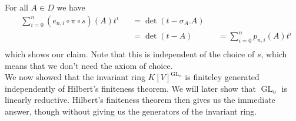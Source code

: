 \begin{dexample}
  For all $A\in D$ we have
  \begin{equation}
    \begin{aligned}
      &\sum_{i=0}^n (e_{n,i} \circ \pi \circ s)(A)t^i&&=\operatorname{det}(t-\sigma_A.A)\\
      &&&=\operatorname{det}(t-A)
      &&=\sum_{i=0}^n p_{n,i}(A)t^i\\
    \end{aligned}
  \end{equation}
  which shows our claim.
  Note that this is independent of the choice of $s$, which means that we don't need the axiom of choice.\\
  We now showed that the invariant ring $K[V]^{\operatorname{GL}_n}$ is finiteley generated independently of Hilbert's finiteness theorem.
  We will later show that $\operatorname{GL}_n$ is linearly reductive.
  Hilbert's finiteness theorem then gives us the immediate answer, though without giving us the generators of the invariant ring.
\end{dexample}


